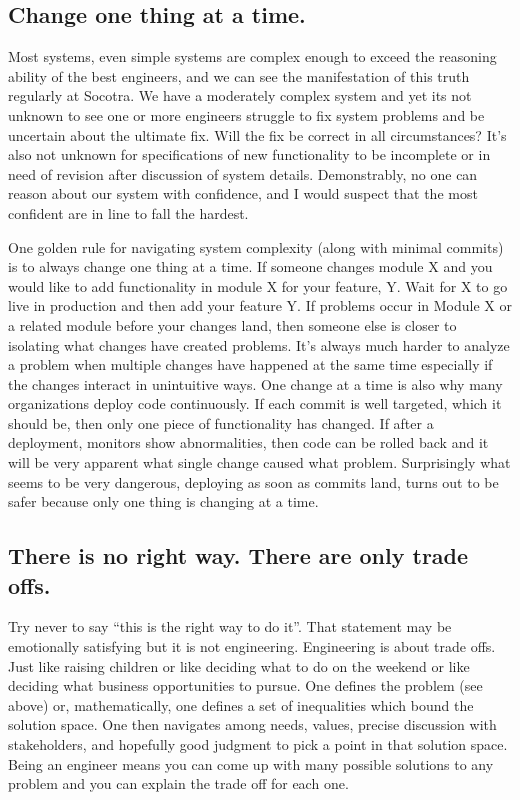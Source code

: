 \subsection{Change one thing at a time.}
Most systems, even simple systems are complex enough to exceed the reasoning ability of the best engineers, and we can see the manifestation of this truth regularly at
Socotra. We have a moderately complex system and yet its not unknown to see one or more engineers struggle to fix system problems and
be uncertain about the ultimate fix. Will the fix be correct in all circumstances? It's also not unknown for specifications of new functionality
to be incomplete or in need of revision after discussion of system details. Demonstrably, no one can reason about our system with confidence, and
I would suspect that the most confident are in line to fall the hardest.

One golden rule for navigating system complexity (along with minimal commits) is to always change one thing at a time. If someone changes module
X and you would like to add functionality in module X for your feature, Y. Wait for X to go live in production and then add your feature Y. If
problems occur in Module X or a related module before your changes land, then someone else is closer to isolating what changes have created problems.
It's always much harder to analyze a problem when multiple changes have happened at the same time especially if the changes interact in
unintuitive ways. One change at a time is also why many organizations deploy code continuously. If each commit is well targeted, which it should
be, then only one piece of functionality has changed. If after a deployment, monitors show abnormalities, then code can be rolled back and it will
be very apparent what single change caused what problem. Surprisingly what seems to be very dangerous, deploying as soon as commits land, turns
out to be safer because only one thing is changing at a time.

\subsection{There is no right way. There are only trade offs.}
Try never to say ``this is the right way to do it''. That statement may be emotionally satisfying but it is not engineering. Engineering
is about trade offs. Just like raising children or like deciding what to do on the weekend or like deciding what business opportunities to pursue.
One defines the problem (see above) or, mathematically, one defines a set of inequalities which bound the solution space. One then navigates among needs,
values, precise discussion with stakeholders, and hopefully good judgment to pick a point in that solution space. Being an engineer means you
can come up with many possible solutions to any problem and you can explain the trade off for each one.

